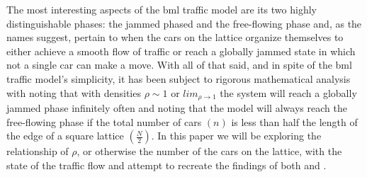 \noindent The most interesting aspects of the \gls{bml} traffic model are its two highly distinguishable phases: the jammed phased and the free-flowing phase and, as the names suggest, pertain to when the cars on the lattice organize themselves to either achieve a smooth flow of traffic or reach a globally jammed state in which not a single car can make a move. With all of that said, and in spite of the \gls{bml} traffic model's simplicity, it has been subject to rigorous mathematical analysis with \citet{Omer} noting that with densities $\rho \sim 1$ or $lim_{\rho \to 1}$ the system will reach a globally jammed phase infinitely often and \citet{Austin} noting that the model will always reach the free-flowing phase if the total number of cars $(n)$ is less than half the length of the edge of a square lattice $(\frac{N}{2})$. In this paper we will be exploring the relationship of $\rho$, or otherwise the number of the cars on the lattice, with the state of the traffic flow and attempt to recreate the findings of both \citeauthor{Omer} and \citeauthor{Austin}.